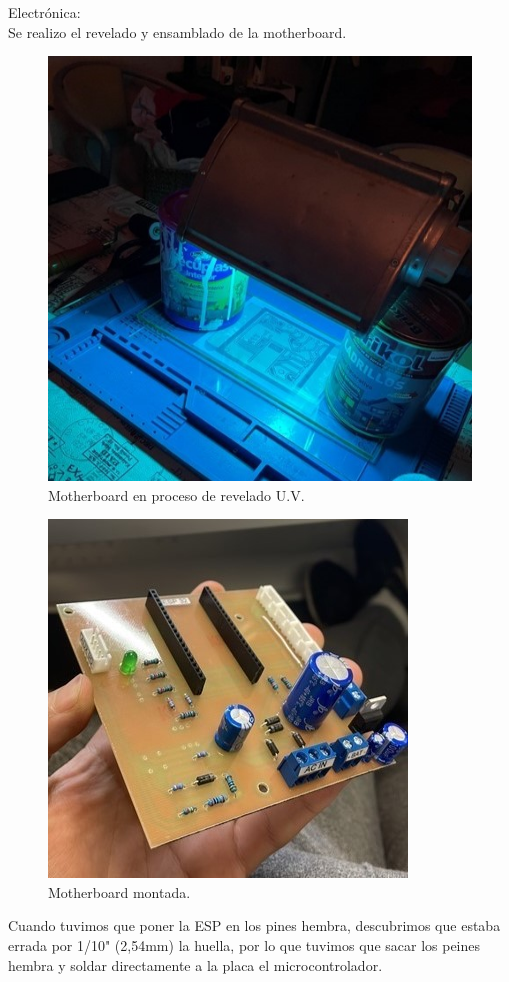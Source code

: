 Electrónica:\\

Se realizo el revelado y ensamblado de la motherboard.\\

\begin{figure}[H]
    \centering
    \includegraphics[width=0.6\linewidth]{informes/IMG_8461.jpg}
    \caption{Motherboard en proceso de revelado U.V.}
\end{figure}

\begin{figure}[H]
    \centering
    \includegraphics[width=0.6\linewidth]{informes/9BB4662B-F42F-44F3-809F-A02696793D25 (1).jpg}
    \caption{Motherboard montada.}
    
\end{figure}

Cuando tuvimos que poner la ESP en los pines hembra, descubrimos que estaba errada por 1/10" (2,54mm) la huella, por lo que tuvimos que sacar los peines hembra y soldar directamente a la placa el microcontrolador.\\


